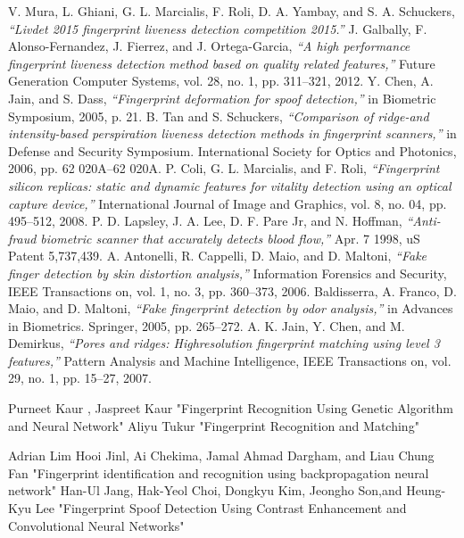 \documentclass[a4paper,12pt,oneside]{article}
\begin{document}
\newpage
\cleardoublepage
{}
\begin{thebibliography}{9}


 V. Mura, L. Ghiani, G. L. Marcialis, F. Roli, D. A. Yambay, and
S. A. Schuckers,\emph{ “Livdet 2015 fingerprint liveness detection competition
2015.”}
 J. Galbally, F. Alonso-Fernandez, J. Fierrez, and J. Ortega-Garcia,\emph{ “A
high performance fingerprint liveness detection method based on quality
related features,” }Future Generation Computer Systems, vol. 28, no. 1,
pp. 311–321, 2012.
 Y. Chen, A. Jain, and S. Dass, \emph{“Fingerprint deformation for spoof
detection,” }in Biometric Symposium, 2005, p. 21.
 B. Tan and S. Schuckers,\emph{ “Comparison of ridge-and intensity-based
perspiration liveness detection methods in fingerprint scanners,”} in
Defense and Security Symposium. International Society for Optics and
Photonics, 2006, pp. 62 020A–62 020A.
 P. Coli, G. L. Marcialis, and F. Roli, \emph{“Fingerprint silicon replicas: static
and dynamic features for vitality detection using an optical capture
device,”} International Journal of Image and Graphics, vol. 8, no. 04,
pp. 495–512, 2008.
 P. D. Lapsley, J. A. Lee, D. F. Pare Jr, and N. Hoffman, \emph{“Anti-fraud
biometric scanner that accurately detects blood flow,”} Apr. 7 1998, uS
Patent 5,737,439.
A. Antonelli, R. Cappelli, D. Maio, and D. Maltoni, \emph{“Fake finger detection
by skin distortion analysis,” }Information Forensics and Security,
IEEE Transactions on, vol. 1, no. 3, pp. 360–373, 2006.
 Baldisserra, A. Franco, D. Maio, and D. Maltoni, \emph{“Fake fingerprint
detection by odor analysis,”} in Advances in Biometrics. Springer, 2005,
pp. 265–272.
 A. K. Jain, Y. Chen, and M. Demirkus,\emph{ “Pores and ridges: Highresolution
fingerprint matching using level 3 features,”} Pattern Analysis
and Machine Intelligence, IEEE Transactions on, vol. 29, no. 1, pp.
15–27, 2007.

Purneet Kaur , Jaspreet Kaur {"Fingerprint Recognition Using Genetic Algorithm and Neural Network"} 
Aliyu Tukur {"Fingerprint Recognition and Matching" }

  Adrian Lim Hooi Jinl, Ai Chekima, Jamal Ahmad Dargham, and Liau Chung Fan {"Fingerprint identification and recognition using backpropagation neural network"}
Han-Ul Jang, Hak-Yeol Choi, Dongkyu Kim, Jeongho Son,and Heung-Kyu Lee {"Fingerprint Spoof Detection Using Contrast
Enhancement and Convolutional
Neural Networks"}


\end{thebibliography}
\end{document}
